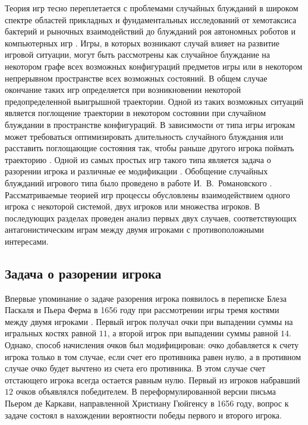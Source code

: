 Теория игр тесно переплетается с проблемами случайных блужданий в широком спектре областей прикладных и фундаментальных исследований 
от хемотаксиса бактерий \cite{zaburdaev_levy_2015, bib1, bib2} и рыночных взаимодействий \cite{li_evolutionary_2013, friedman_towards_2001} 
до блужданий роя автономных роботов \cite{marques_particle_2006, xiong_intelligent_2008} и компьютерных игр \cite{outlaw_markov_2016, dankel_long_2004, dshalalow_random_2008}.
Игры, в которых возникают случай влияет на развитие игровой ситуации, могут быть рассмотрены как случайное блуждание
на некотором графе всех возможных конфигураций предметов игры или в некотором непрерывном пространстве всех возможных состояний.
В общем случае окончание таких игр определяется при возникновении некоторой предопределенной выигрышной траектории.
Одной из таких возможных ситуаций является поглощение траектории в некотором состоянии при случайном блуждании в пространстве конфигураций.
В зависимости от типа игры игрокам может требоваться оптимизировать длительность случайного блуждания или расставить поглощающие состояния 
так, чтобы раньше другого игрока поймать траекторию \cite{baldi_intransitiveness_2020}. Одной из самых простых игр такого типа является задача о разорении игрока 
\cite{feller_introduction_1968}
и различные ее модификации \cite{baldi_intransitiveness_2020, cencetti_second_2016, kittas_trapping_2008, lee_random-walk_1989}. Обобщение случайных блужданий игрового типа было проведено в работе 
И.~В.~Романовского \cite{romanovsky_1961}.
Рассматриваемые теорией игр процессы обусловлены взаимодействием одного игрока с некоторой системой, двух игроков или множества игроков.
В последующих разделах проведен анализ первых двух случаев, соответствующих антагонистическим играм между двумя игроками 
с противоположными интересами.

\subsection{Задача о разорении игрока}\label{subsec:ch1/sec3/sub1}

Впервые упоминание о задаче разорения игрока появилось в переписке Блеза Паскаля и Пьера Ферма в 1656 году при рассмотрении игры тремя костями между двумя игроками \cite{renyi_1980}.
Первый игрок получал очки при выпадении суммы на игральных костях равной $11$, а второй игрок при выпадении суммы равной $14$. Однако, способ начисления очков 
был модифицирован: очко добавляется к счету игрока только в том случае, если счет его противника равен нулю, а в противном случае очко будет вычтено из счета его противника.
В этом случае счет отстающего игрока всегда остается равным нулю. Первый из игроков набравший $12$ очков объявлялся победителем. В переформулированной версии
письма Пьером де Каркави, направленной Христиану Гюйгенсу в 1656 году, вопрос к задаче состоял в нахождении вероятности победы первого и второго игрока. 

